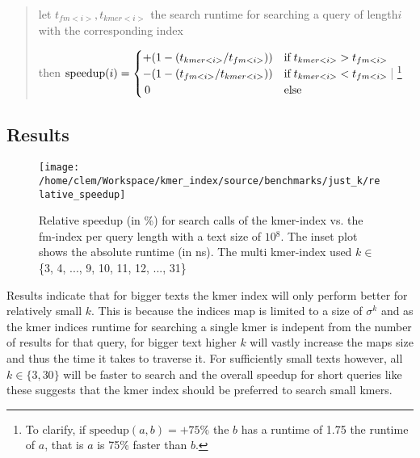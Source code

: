 \begin{verse}
let $t_{fm<i>},t_{kmer<i>}$ the search runtime for searching a query
of length$i$ with the corresponding index

then $\text{{speedup}}(i)=\begin{cases}
+(1-(t_{kmer<i>}/t_{fm<i>})) & \text{{if}\;}t_{kmer<i>}>t_{fm<i>}\\
-(1-(t_{fm<i>}/t_{kmer<i>})) & \text{{if}\;}t_{kmer<i>}<t_{fm<i>}\\
\,0 & \text{{else}}
\end{cases}$|
\footnote{To clarify, if $\text{speedup}(a,b)=+75\%$ the $b$ has a runtime of 1.75 the runtime of $a$, that is $a$ is 75\% faster than $b$.}
\end{verse}

\subsection{Results}
\begin{figure}[H]
\texttt{[image: /home/clem/Workspace/kmer\_index/source/benchmarks/just\_k/relative\_speedup]}

\caption{Relative speedup (in \%) for search calls of the kmer-index vs. the
fm-index per query length with a text size of $10{{}^8}$. The inset
plot shows the absolute runtime (in ns). The multi kmer-index used $k\in$
\{3, 4, ..., 9, 10, 11, 12, ..., 31\}}
\end{figure}

Results indicate that for bigger texts the kmer index will only perform
better for relatively small $k$. This is because the indices map is
limited to a size of $\sigma^{k}$ and as the kmer indices runtime
for searching a single kmer is indepent from the number of results
for that query, for bigger text higher $k$ will vastly increase the
maps size and thus the time it takes to traverse it. For sufficiently
small texts however, all $k\in\{3,30\}$ will be faster to search and
the overall speedup for short queries like these suggests that the
kmer index should be preferred to search small kmers.

